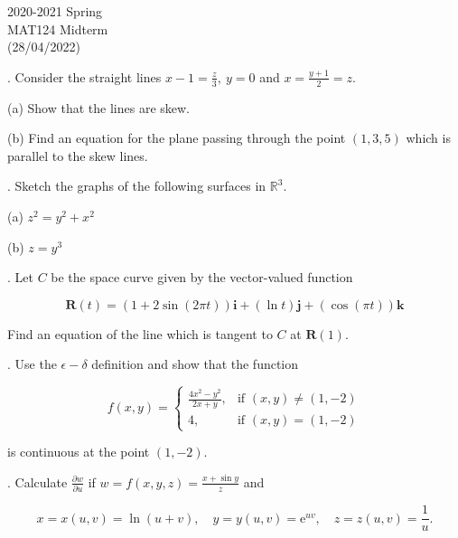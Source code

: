 \documentclass{article}
\begin{document}
\pagestyle{empty}
\large

\begin{center}
2020-2021 Spring \\MAT124 Midterm\\(28/04/2022)
\end{center}

. Consider the straight lines $\displaystyle x-1=\frac z3,\: y=0$ and $\displaystyle x=\frac{y+1}2=z$.

\hfill

\noindent (a) Show that the lines are skew.

\hfill

\noindent (b) Find an equation for the plane passing through the point $(1,3,5)$ which is parallel to the skew lines.

\hfill

. Sketch the graphs of the following surfaces in $\mathbb{R}^3$.

\hfill

\noindent (a) $z^2=y^2+x^2$

\hfill

\noindent (b) $z=y^3$

\hfill

. Let $C$ be the space curve given by the vector-valued function

\[\mathbf{R}(t)=(1+2\sin(2\pi t))\mathbf{i}+(\ln t)\mathbf{j}+(\cos(\pi t))\mathbf{k}\]

\hfill

\noindent Find an equation of the line which is tangent to $C$ at $\mathbf{R}(1)$.

\hfill

. Use the $\epsilon-\delta$ definition and show that the function

\[f(x,y)=\left\{\begin{array}{cl}
\displaystyle\frac{4x^2-y^2}{2x+y},& \text{if }(x,y)\neq(1,-2)\\[1em]
4,&\text{if }(x,y)=(1,-2)
\end{array}\right.\]

\hfill

\noindent is continuous at the point $(1,-2)$.

\hfill

. Calculate $\displaystyle\frac{\partial w}{\partial u}$ if $\displaystyle w=f(x,y,z)=\frac{x+\sin y}z$ and

\[x=x(u,v)=\ln(u+v),\quad y=y(u,v)=\mathrm{e}^{uv},\quad z=z(u,v)=\frac1u.\]
\end{document}

